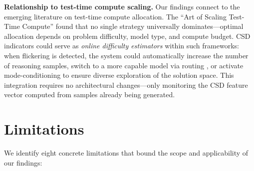 \documentclass[11pt,letterpaper]{article}
\begin{document}
\textbf{Relationship to test-time compute scaling.} Our findings connect to the emerging literature on test-time compute allocation. The ``Art of Scaling Test-Time Compute'' \cite{ding2025bestroute} found that no single strategy universally dominates---optimal allocation depends on problem difficulty, model type, and compute budget. CSD indicators could serve as \emph{online difficulty estimators} within such frameworks: when flickering is detected, the system could automatically increase the number of reasoning samples, switch to a more capable model via routing \cite{ding2025bestroute}, or activate mode-conditioning \cite{wu2025modec} to ensure diverse exploration of the solution space. This integration requires no architectural changes---only monitoring the CSD feature vector computed from samples already being generated.

\section{Limitations}
\label{sec:limitations}

We identify eight concrete limitations that bound the scope and applicability of our findings:
\end{document}
